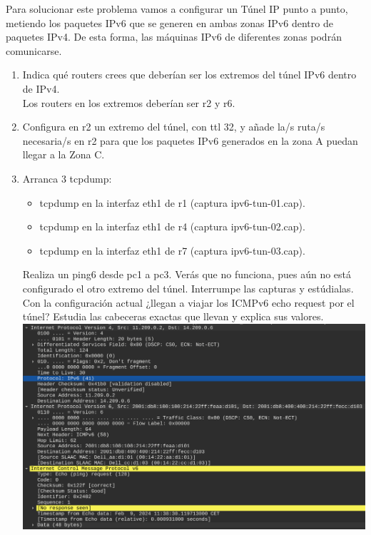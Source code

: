 \documentclass[12pt, a4paper]{report}
\begin{document}
Para solucionar este problema vamos a configurar un Túnel IP punto a punto, metiendo los
paquetes IPv6 que se generen en ambas zonas IPv6 dentro de paquetes IPv4. De esta forma, las
máquinas IPv6 de diferentes zonas podrán comunicarse.\\
\begin{enumerate}
	\item Indica qué routers crees que deberían ser los extremos del túnel IPv6 dentro de IPv4.\\
	
	Los routers en los extremos deberían ser r2 y r6.
	\item Configura en r2 un extremo del túnel, con ttl 32, y añade la/s ruta/s necesaria/s en r2 para
	que los paquetes IPv6 generados en la zona A puedan llegar a la Zona C.
	\item Arranca 3 tcpdump:
	\begin{itemize}
		\item tcpdump en la interfaz eth1 de r1 (captura ipv6-tun-01.cap).
		\item tcpdump en la interfaz eth1 de r4 (captura ipv6-tun-02.cap).
		\item tcpdump en la interfaz eth1 de r7 (captura ipv6-tun-03.cap).
	\end{itemize}
	Realiza un ping6 desde pc1 a pc3. Verás que no funciona, pues aún no está configurado el
	otro extremo del túnel. Interrumpe las capturas y estúdialas.\\
	Con la configuración actual ¿llegan a viajar los ICMPv6 echo request por el túnel? Estudia las
	cabeceras exactas que llevan y explica sus valores.\\
	
	\includegraphics[width=1\textwidth]{ej3_3}\\
	

\end{enumerate}
\end{document}
